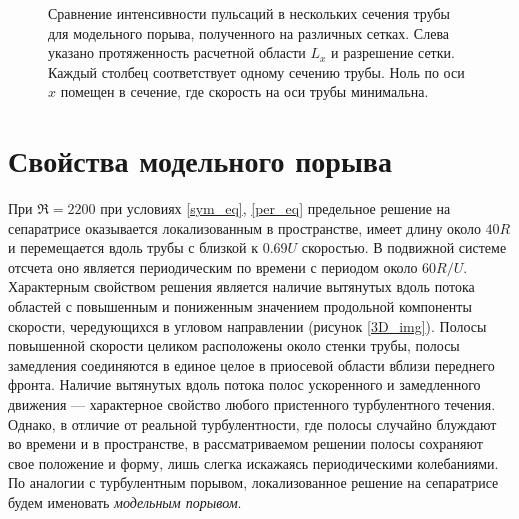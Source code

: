 \begin{figure}[h]
\caption{Сравнение интенсивности пульсаций в нескольких сечения трубы для модельного порыва, полученного на различных сетках. Слева указано протяженность расчетной области $L_x$ и разрешение сетки. Каждый столбец соответствует одному сечению трубы. Ноль по оси $x$ помещен в сечение, где скорость на оси трубы минимальна.}
\label{grid_cmp_map}
\end{figure}

\section{Свойства модельного порыва}

При $\Re=2200$ при условиях \eqref{sym_eq}, \eqref{per_eq} предельное решение на сепаратрисе оказывается локализованным в пространстве, имеет длину около $40R$ и перемещается вдоль трубы с близкой к $0.69U$ скоростью. В подвижной системе отсчета оно является периодическим по времени с периодом около $60 R/U$. Характерным свойством решения является наличие вытянутых вдоль потока областей с повышенным и пониженным значением продольной компоненты скорости, чередующихся в угловом направлении (рисунок \ref{3D_img}). Полосы повышенной скорости целиком расположены около стенки трубы, полосы замедления соединяются в единое целое в приосевой области вблизи переднего фронта. Наличие вытянутых вдоль потока полос ускоренного и замедленного движения --- характерное свойство любого пристенного турбулентного течения. Однако, в отличие от реальной турбулентности, где полосы случайно блуждают во времени и в пространстве, в рассматриваемом решении полосы сохраняют свое положение и форму, лишь слегка искажаясь периодическими колебаниями. По аналогии с турбулентным порывом, локализованное решение на сепаратрисе будем именовать {\it модельным порывом}.

